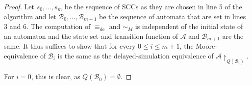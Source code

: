 \begin{proof}
	Let $s_0, \dots, s_m$ be the sequence of SCCs as they are chosen in line 5 of the algorithm and let $\mathcal{B}_0, \dots, \mathcal{B}_{m+1}$ be the sequence of automata that are set in lines 3 and 6. The computation of $\equiv_\text{de}$ and $\sim_M$ is independent of the initial state of an automaton and the state set and transition function of $\mathcal{A}$ and $\mathcal{B}_{m+1}$ are the same. It thus suffices to show that for every $0 \leq i \leq m+1$, the Moore-equivalence of $\mathcal{B}_i$ is the same as the delayed-simulation equivalence of $\mathcal{A} \upharpoonright_{Q(\mathcal{B}_i)}$.
	
	For $i = 0$, this is clear, as $Q(\mathcal{B}_0) = \emptyset$.
\end{proof}

























